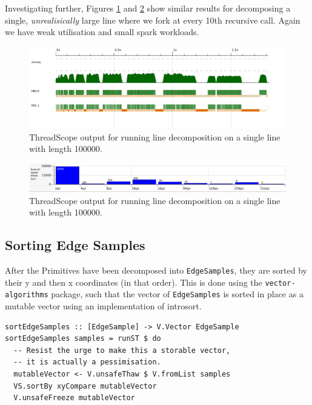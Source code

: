 \documentclass[12pt, a4paper]{article}
\begin{document}
Investigating further, Figures \ref{fig:single-line-thread} and \ref{fig:single-line-thread-sparks}
show similar results for decomposing a single, \textit{unrealisically} large line where
 we fork at every 10th recursive call. Again we have
 weak utilisation and small spark workloads.

\begin{figure}[h!]
  \centering
  \includegraphics[width=0.85\linewidth]{../threadscope/lines/single-line-every-10}
  \caption{ThreadScope output for running line decomposition on a single line with length
    100000.}
  \label{fig:single-line-thread}
\end{figure}

\begin{figure}[h!]
  \centering
  \includegraphics[width=0.85\linewidth]{../threadscope/lines/single-line-every-10-spark-times}
  \caption{ThreadScope output for running line decomposition on a single line with length
    100000.}
  \label{fig:single-line-thread-sparks}
\end{figure}

\subsection{Sorting Edge Samples}

After the Primitives have been decomposed into \texttt{EdgeSamples}, they are sorted by their y and then x coordinates (in that order).
This is done using the \texttt{vector-algorithms} package, such that the vector of \texttt{EdgeSamples} is sorted in place as a mutable vector
 using an implementation of introsort.
\begin{lstlisting}[caption={Sorting the edge samples.}]
sortEdgeSamples :: [EdgeSample] -> V.Vector EdgeSample
sortEdgeSamples samples = runST $ do
  -- Resist the urge to make this a storable vector,
  -- it is actually a pessimisation.
  mutableVector <- V.unsafeThaw $ V.fromList samples
  VS.sortBy xyCompare mutableVector
  V.unsafeFreeze mutableVector
\end{lstlisting}
\end{document}
